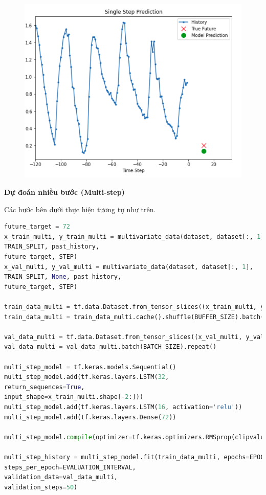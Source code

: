 \begin{center}
	\begin{figure}[htp]
		\begin{center}
			\includegraphics[scale=0.45]{./images/11.png}
		\end{center}
	\end{figure}
\end{center}


\vspace{5cm}
\changefontsizes{14pt}
\setlength{\parindent}{0cm}
\textbf{Dự đoán nhiều bước (Multi-step)}


Các bước bên dưới thực hiện tương tự như trên.

\begin{lstlisting}[language=Python]
future_target = 72
x_train_multi, y_train_multi = multivariate_data(dataset, dataset[:, 1], 0,
TRAIN_SPLIT, past_history,
future_target, STEP)
x_val_multi, y_val_multi = multivariate_data(dataset, dataset[:, 1],
TRAIN_SPLIT, None, past_history,
future_target, STEP)

train_data_multi = tf.data.Dataset.from_tensor_slices((x_train_multi, y_train_multi))
train_data_multi = train_data_multi.cache().shuffle(BUFFER_SIZE).batch(BATCH_SIZE).repeat()

val_data_multi = tf.data.Dataset.from_tensor_slices((x_val_multi, y_val_multi))
val_data_multi = val_data_multi.batch(BATCH_SIZE).repeat()

multi_step_model = tf.keras.models.Sequential()
multi_step_model.add(tf.keras.layers.LSTM(32,
return_sequences=True,
input_shape=x_train_multi.shape[-2:]))
multi_step_model.add(tf.keras.layers.LSTM(16, activation='relu'))
multi_step_model.add(tf.keras.layers.Dense(72))

multi_step_model.compile(optimizer=tf.keras.optimizers.RMSprop(clipvalue=1.0), loss='mae')

multi_step_history = multi_step_model.fit(train_data_multi, epochs=EPOCHS,
steps_per_epoch=EVALUATION_INTERVAL,
validation_data=val_data_multi,
validation_steps=50)
\end{lstlisting}

